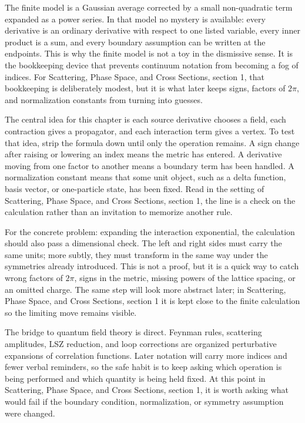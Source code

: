 The finite model is a Gaussian average corrected by a small non-quadratic term expanded as a power series.  In that model no mystery is available: every derivative is an ordinary derivative with respect to one listed variable, every inner product is a sum, and every boundary assumption can be written at the endpoints.  This is why the finite model is not a toy in the dismissive sense.  It is the bookkeeping device that prevents continuum notation from becoming a fog of indices.  For Scattering, Phase Space, and Cross Sections, section 1, that bookkeeping is deliberately modest, but it is what later keeps signs, factors of \(2\pi\), and normalization constants from turning into guesses.

The central idea for this chapter is each source derivative chooses a field, each contraction gives a propagator, and each interaction term gives a vertex.  To test that idea, strip the formula down until only the operation remains.  A sign change after raising or lowering an index means the metric has entered.  A derivative moving from one factor to another means a boundary term has been handled.  A normalization constant means that some unit object, such as a delta function, basis vector, or one-particle state, has been fixed.  Read in the setting of Scattering, Phase Space, and Cross Sections, section 1, the line is a check on the calculation rather than an invitation to memorize another rule.

For the concrete problem: expanding the interaction exponential, the calculation should also pass a dimensional check.  The left and right sides must carry the same units; more subtly, they must transform in the same way under the symmetries already introduced.  This is not a proof, but it is a quick way to catch wrong factors of \(2\pi\), signs in the metric, missing powers of the lattice spacing, or an omitted charge.  The same step will look more abstract later; in Scattering, Phase Space, and Cross Sections, section 1 it is kept close to the finite calculation so the limiting move remains visible.

The bridge to quantum field theory is direct.  Feynman rules, scattering amplitudes, LSZ reduction, and loop corrections are organized perturbative expansions of correlation functions.  Later notation will carry more indices and fewer verbal reminders, so the safe habit is to keep asking which operation is being performed and which quantity is being held fixed.  At this point in Scattering, Phase Space, and Cross Sections, section 1, it is worth asking what would fail if the boundary condition, normalization, or symmetry assumption were changed.

